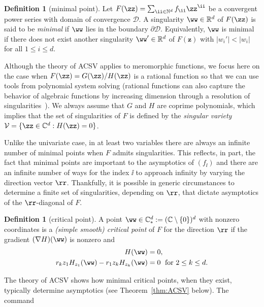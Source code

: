 \documentclass[a4paper]{amsart}
\theoremstyle{definition}
\newtheorem{definition}[theorem]{Definition}
\newcommand{\C}{{\mathbb C}}
\newcommand{\R}{{\mathbb R}}
\newcommand{\N}{{\mathbb N}}
\newcommand{\dom}{\mathcal{D}}
\newcommand{\sing}{\mathcal{V}}
\begin{document}
\begin{definition}[minimal point]
Let $F(\zz) = \sum_{\ii\in\N^d}f_\ii\zz^\ii$ be a convergent power series with domain of convergence $\dom$. A singularity $\ww\in\R^d$ of $F(\zz)$ is said to be \emph{minimal} if $\ww$ lies in the boundary $\partial \dom$. Equivalently, $\ww$ is minimal if there does not exist another singularity $\ww' \in \R^d$ of $F(\bm{z})$ with $|w_i'| < |w_i|$ for all $1 \le i \le d$.
\end{definition}

Although the theory of ACSV applies to meromorphic functions, we focus here on the case when $F(\zz)=G(\zz)/H(\zz)$ is a rational function so that we can use tools from polynomial system solving (rational functions can also capture the behavior of algebraic functions by increasing dimension through a resolution of singularities~\cite{GreenwoodMelczerRuzaWilson2022}). We always assume that $G$ and $H$ are coprime polynomials, which implies that the set of singularities of $F$ is defined by the \emph{singular variety} $\sing = \{\zz\in\C^d : H(\zz)=0\}$.

Unlike the univariate case, in at least two variables there are always an infinite number of minimal points when $F$ admits singularities. This reflects, in part, the fact that minimal points are important to the asymptotics of $(f_\ii)$ and there are an infinite number of ways for the index $\ii$ to approach infinity by varying the direction vector $\rr$. Thankfully, it is possible in generic circumstances to determine a finite set of singularities, depending on $\rr$, that dictate asymptotics of the $\rr$-diagonal of $F$.

\begin{definition}[critical point]
A point $\ww \in \C_*^d := (\C\setminus \{0\})^d$ with nonzero coordinates is a \emph{(simple smooth) critical point} of $F$ for the direction $\rr$ if the gradient $(\nabla H)(\ww)$ is nonzero and
\begin{align}
 \begin{split}
    H(\ww)&=0,\\
    r_kz_1H_{z_1}(\ww) - r_1z_kH_{z_k}(\ww) &= 0 \; \text{ for } 2\leq k\leq d.
    \end{split}  \label{eq:CP}
\end{align}
\end{definition}

The theory of ACSV shows how minimal critical points, when they exist, typically determine asymptotics (see Theorem~\ref{thm:ACSV} below). The command 
\end{document}
